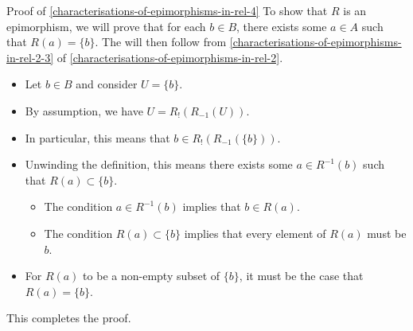 \begin{Proof}{Proof of \cref{characterisations-of-epimorphisms-in-rel-4}}%
    To show that $R$ is an epimorphism, we will prove that for each $b\in B$, there exists some $a\in A$ such that $R(a)=\{b\}$. The will then follow from \cref{characterisations-of-epimorphisms-in-rel-2-3} of \cref{characterisations-of-epimorphisms-in-rel-2}.
    \begin{itemize}
        \item Let $b\in B$ and consider $U=\{b\}$.
        \item By assumption, we have $U=R_{!}(R_{-1}(U))$.
        \item In particular, this means that $b\in R_{!}(R_{-1}(\{b\}))$.
        \item Unwinding the definition, this means there exists some $a\in R^{-1}(b)$ such that $R(a)\subset\{b\}$.
            \begin{itemize}
                \item The condition $a\in R^{-1}(b)$ implies that $b\in R(a)$.
                \item The condition $R(a)\subset\{b\}$ implies that every element of $R(a)$ must be $b$.
            \end{itemize}
        \item For $R(a)$ to be a non-empty subset of $\{b\}$, it must be the case that $R(a)=\{b\}$.
    \end{itemize}
    This completes the proof.


\end{Proof}
